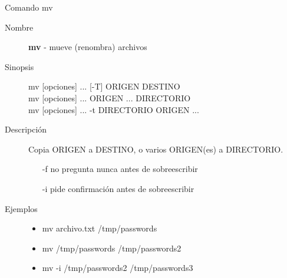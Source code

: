 \begin{frame}[c]{Comando mv}
  \begin{description}
    \item[Nombre]
      \textbf{mv} - mueve (renombra) archivos

    \vspace{\baselineskip}
    \item[Sinopsis]
      mv [opciones] ... [-T]  ORIGEN  DESTINO \\
      mv [opciones] ... ORIGEN ... DIRECTORIO \\
      mv [opciones] ... -t DIRECTORIO  ORIGEN ...

    \vspace{\baselineskip}
    \item[Descripción]
      Copia ORIGEN a DESTINO, o varios ORIGEN(es) a DIRECTORIO.

      \begin{itemize}
        \item [-f] no pregunta nunca antes de sobreescribir
        \item [-i] pide confirmación antes de sobreescribir
      \end{itemize}

    \vspace{\baselineskip}
    \item[Ejemplos]
      \begin{itemize}
        \item mv archivo.txt /tmp/passwords
        \item mv /tmp/passwords /tmp/passwords2
        \item mv -i /tmp/passwords2 /tmp/passwords3
      \end{itemize}
  \end{description}
\end{frame}

